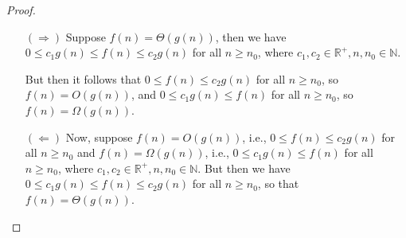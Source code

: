 
\begin{proof}
    \begin{itemize}
        \item[$(\Rightarrow)$] Suppose $f(n) = \Theta(g(n))$, then we have 
            $0 \leq c_1 g(n) \leq f(n) \leq c_2 g(n)$ for all $n \geq n_0$, 
            where $c_1, c_2 \in \mathbb{R}^+, n, n_0 \in \mathbb{N}$.

            But then it follows that $0 \leq f(n) \leq c_2 g(n)$ for all $n \geq n_0$, 
            so $f(n) = O(g(n))$, and $0 \leq c_1 g(n) \leq f(n)$ for all $n \geq n_0$, 
            so $f(n) = \Omega(g(n))$.

        \item[$(\Leftarrow)$] 
            Now, suppose $f(n) = O(g(n))$, i.e., $0 \leq f(n) \leq c_2 g(n)$ for all 
            $n \geq n_0$ and $f(n) = \Omega(g(n))$, i.e., $0 \leq c_1 g(n) \leq f(n)$ 
            for all $n \geq n_0$, where $c_1, c_2 \in \mathbb{R}^+, n, n_0 \in \mathbb{N}$. 
            But then we have $0 \leq c_1 g(n) \leq f(n) \leq c_2 g(n)$ for all $n \geq n_0$, 
            so that $f(n) = \Theta(g(n))$.
    \end{itemize}
\end{proof}
